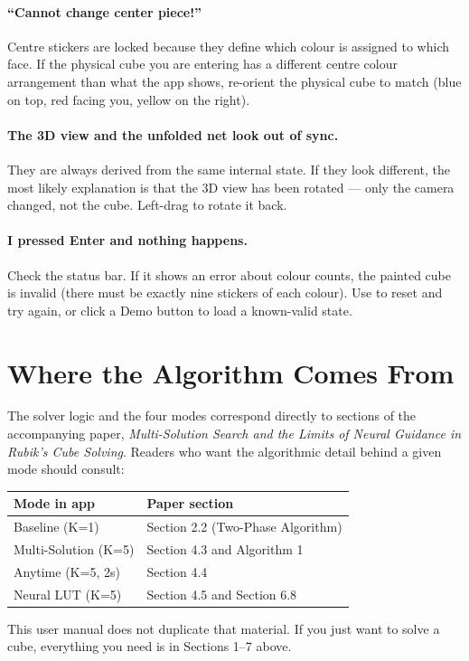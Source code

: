 \documentclass[11pt,a4paper]{article}
\newcommand{\key}[1]{\fbox{\texttt{\strut#1}}}
\begin{document}
\paragraph{``Cannot change center piece!''}
Centre stickers are locked because they define which colour is assigned
to which face. If the physical cube you are entering has a different
centre colour arrangement than what the app shows, re-orient the physical
cube to match (blue on top, red facing you, yellow on the right).

\paragraph{The 3D view and the unfolded net look out of sync.}
They are always derived from the same internal state. If they look
different, the most likely explanation is that the 3D view has been
rotated --- only the camera changed, not the cube. Left-drag to rotate
it back.

\paragraph{I pressed Enter and nothing happens.}
Check the status bar. If it shows an error about colour counts, the
painted cube is invalid (there must be exactly nine stickers of each
colour). Use \key{R} to reset and try again, or click a Demo button to
load a known-valid state.

\section{Where the Algorithm Comes From}

The solver logic and the four modes correspond directly to sections of
the accompanying paper, \emph{Multi-Solution Search and the Limits of
Neural Guidance in Rubik's Cube Solving}. Readers who want the
algorithmic detail behind a given mode should consult:

\begin{center}
\begin{tabular}{@{}ll@{}}
\toprule
\textbf{Mode in app} & \textbf{Paper section} \\
\midrule
Baseline (K=1)        & Section 2.2 (Two-Phase Algorithm) \\
Multi-Solution (K=5)  & Section 4.3 and Algorithm 1 \\
Anytime (K=5, 2s)     & Section 4.4 \\
Neural LUT (K=5)      & Section 4.5 and Section 6.8 \\
\bottomrule
\end{tabular}
\end{center}

This user manual does not duplicate that material. If you just want to
solve a cube, everything you need is in Sections 1--7 above.
\end{document}
